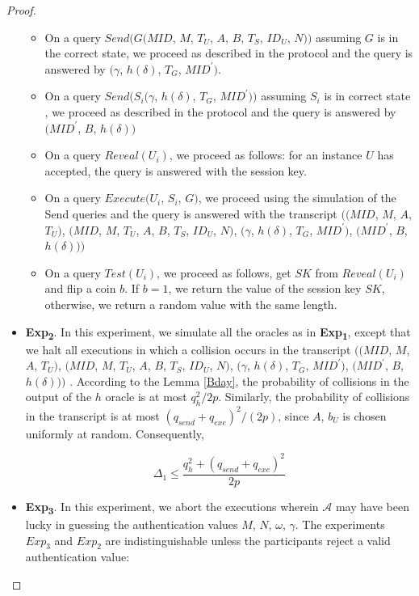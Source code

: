 \documentclass[a4paper,12pt]{report}
\begin{document}
\begin{proof}
\begin{itemize}
\begin{itemize}
\item On a query $Send(G(MID$, $M$, $T_U$, $A$, $B$, $T_S$, $ID_U$, $N))$
assuming $G$ is in the correct state, we proceed as described in the
protocol and the query is answered by $(\gamma$, $h(\delta)$, $T_G$,
$MID^{\prime})$.

\item On a query $Send(S_{i}(\gamma$, $h(\delta)$, $T_G$, $MID^{\prime}))$
assuming $S_{i}$ is in correct state , we proceed as described in
the protocol and the query is answered by $(MID^{\prime}$, $B$,
$h(\delta))$

\item On a query $Reveal(U_{i})$, we proceed as follows: for an instance
$U$ has accepted, the query is answered with the session key.

\item On a query $Execute(U_{i}$, $S_{i}$, $G)$, we proceed using the
simulation of the Send queries and the query is answered with the
transcript $((MID$, $M$, $A$, $T_U)$, $(MID$, $M$, $T_U$, $A$, $B$,
$T_S$, $ID_U$, $N)$, $(\gamma$, $h(\delta)$, $T_G$, $MID^{\prime})$,
$(MID^{\prime}$, $B$, $h(\delta)))$

\item On a query $Test(U_{i})$, we proceed as follows, get $SK$ from
$Reveal(U_{i})$ and flip a coin $b$. If $b = 1$, we return the value
of the session key $SK$, otherwise, we return a random value with
the same length.
\end{itemize}

\item \textbf{Exp\textsubscript{2}}. In this experiment, we simulate
all the oracles as in \textbf{Exp\textsubscript{1}}, except that we
halt all executions in which a collision occurs in the transcript
$((MID$, $M$, $A$, $T_U)$, $(MID$, $M$, $T_U$, $A$, $B$, $T_S$,
$ID_U$, $N)$, $(\gamma$, $h(\delta)$, $T_G$, $MID^{\prime})$,
$(MID^{\prime}$, $B$, $h(\delta)))$ . According to the Lemma
\ref{Bday}, the probability of collisions in the output of the $h$
oracle is at most $q^2_{h}/2p$. Similarly, the probability of
collisions in the transcript is at most $(q_{send}+q_{exe})^2/(2p)$,
since $A$, $b_U$ is chosen uniformly at random. Consequently,

\begin{equation}\label{eq4}
\Delta_1 \leq \frac{q_{h}^2+(q_{send}+q_{exe})^2}{2p}
\end{equation}

\item \textbf{Exp\textsubscript{3}}. In this experiment, we abort the
executions wherein $\mathcal{A}$ may have been lucky in guessing the
authentication values $M$, $N$, $\omega$, $\gamma$. The experiments
$Exp_3$ and $Exp_2$ are indistinguishable unless the participants
reject a valid authentication value:


\end{itemize}
\end{proof}
\end{document}
